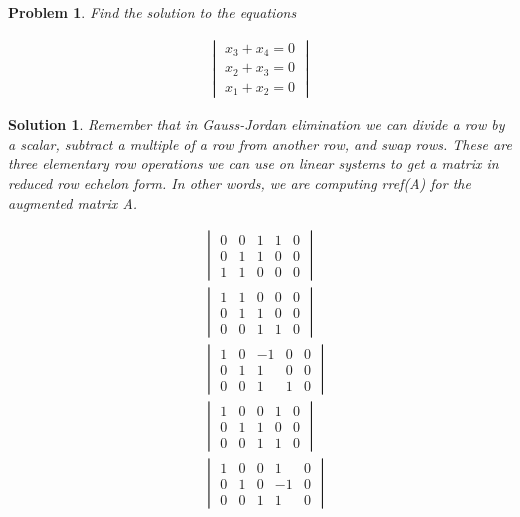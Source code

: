 \documentclass{article}
\newtheorem{problem}{Problem}
\newtheorem*{solution}{Solution}
\begin{document}
\begin{problem}
Find the solution to the equations

\begin{align*}
\begin{vmatrix}
x_{3} +  x_{4} = 0 \\
x_{2} +  x_{3} = 0 \\
x_{1} + x_{2} = 0 
\end{vmatrix}
\end{align*}
\end{problem}

\begin{solution}

Remember that in Gauss-Jordan elimination we can divide a row by a scalar, subtract a multiple of a row from another row, and swap rows. These are three elementary row operations we can use on linear systems to get a matrix in reduced row echelon form. In other words, we are computing rref(A) for the augmented matrix A.

\begin{align*}
&\begin{vmatrix}
0 & 0 & 1 & 1 & 0 \\
0 & 1 & 1 & 0 & 0 \\
1 & 1 & 0 & 0 & 0
\end{vmatrix} \\
&\begin{vmatrix}
1 & 1 & 0 & 0 & 0 \\
0 & 1 & 1 & 0 & 0 \\
0 & 0 & 1 & 1 & 0 
\end{vmatrix} \\
&\begin{vmatrix}
1 & 0 & -1 & 0 & 0 \\
0 & 1 & 1 & 0 & 0 \\
0 & 0 & 1 & 1 & 0 
\end{vmatrix} \\
&\begin{vmatrix}
1 & 0 & 0 & 1 & 0 \\
0 & 1 & 1 & 0 & 0 \\
0 & 0 & 1 & 1 & 0 
\end{vmatrix} \\
&\begin{vmatrix}
1 & 0 & 0 & 1 & 0 \\
0 & 1 & 0 & -1 & 0 \\
0 & 0 & 1 & 1 & 0 
\end{vmatrix} \\
\end{align*}


\end{solution}
\end{document}
